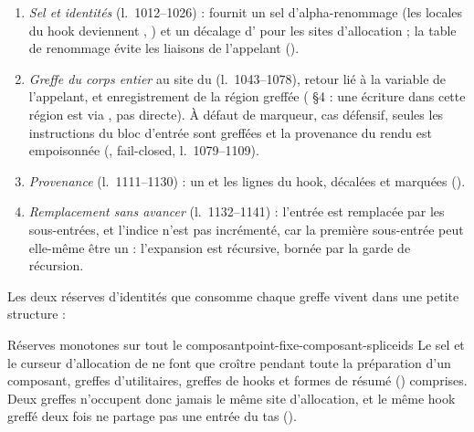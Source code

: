 \begin{enumerate}
    donc devenir  par substitution syntaxique.
  \item \emph{Sel et identités} (l.~1012--1026) : 
    fournit un sel d'alpha-renommage (les locales du hook deviennent
    , ) et un décalage d' pour les
    sites d'allocation ; la table de renommage évite les liaisons de
    l'appelant ().
  \item \emph{Greffe du corps entier} au site du 
    (l.~1043--1078), retour lié à la variable de l'appelant, et
    enregistrement de la région greffée ( §4 : une écriture dans
    cette région est \og via \fg, pas directe). À défaut de
    marqueur, cas défensif, seules les instructions du bloc d'entrée sont
    greffées et la provenance du rendu est empoisonnée
    (, fail-closed, l.~1079--1109).
  \item \emph{Provenance} (l.~1111--1130) : un  et les
    lignes  du hook, décalées et marquées
     ().
  \item \emph{Remplacement sans avancer} (l.~1132--1141) : l'entrée
     est remplacée par les sous-entrées, et l'indice 
    n'est pas incrémenté, car la première sous-entrée peut elle-même être un
     : l'expansion est récursive, bornée par la garde de
    récursion.
\end{enumerate}

Les deux réserves d'identités que consomme chaque greffe vivent dans une
petite structure :


\begin{invariant}{Réserves monotones sur tout le composant}{point-fixe-composant-spliceids}
Le sel et le curseur d'allocation de  ne font que croître
pendant toute la préparation d'un composant, greffes d'utilitaires, greffes
de hooks et formes de résumé () comprises. Deux greffes
n'occupent donc jamais le même site d'allocation, et le même hook greffé
deux fois ne partage pas une entrée du tas ().
\end{invariant}


